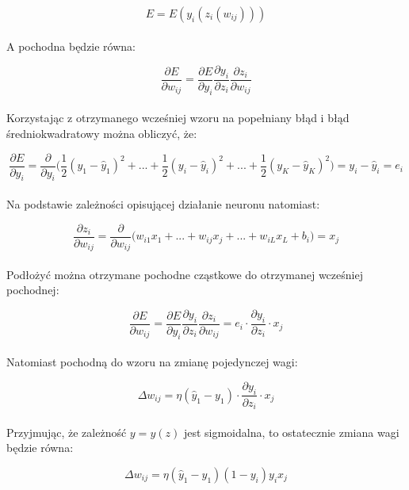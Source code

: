 \documentclass[a4paper, 12pt]{article}
\begin{document}
\begin{equation}
E = E(y_i(z_i(w_{ij})))
\label{Eq:2.20}
\end{equation}\\
A pochodna będzie równa:

\begin{equation}
\frac{\partial E}{\partial w_{ij}} = \frac{\partial E}{\partial y_i} \frac{\partial y_i}{\partial z_i} \frac{\partial z_i}{\partial w_{ij}}
\label{Eq:2.21}
\end{equation}\\
Korzystając z otrzymanego wcześniej wzoru na popełniany błąd i błąd średniokwadratowy można obliczyć, że:

\begin{equation}
\frac{\partial E}{\partial y_i} = \frac{\partial}{\partial y_{i}} \Big( \frac{1}{2} (y_1 - \widehat{y}_1)^{2} + ... + \frac{1}{2} (y_i - \widehat{y}_i)^{2} + ... + \frac{1}{2} (y_K - \widehat{y}_K)^{2} \Big) =  y_i - \widehat{y}_i = e_i
\label{Eq:2.22}
\end{equation}\\
Na podstawie zależności opisującej działanie neuronu natomiast:

\begin{equation}
\frac{\partial z_i}{\partial w_{ij}} = \frac{\partial}{\partial w_{ij}} \Big( w_{i1}x_1 + ... + w_{ij}x_{j} + ... + w_{iL}x_L + b_i \Big) = x_j
\label{Eq:2.23}
\end{equation}\\
Podłożyć można otrzymane pochodne cząstkowe do otrzymanej wcześniej pochodnej:

\begin{equation}
\frac{\partial E}{\partial w_{ij}} = \frac{\partial E}{\partial y_i} \frac{\partial y_i}{\partial z_i} \frac{\partial z_i}{\partial w_{ij}} = e_i \cdot \frac{\partial y_i}{\partial z_i} \cdot x_j
\label{Eq:2.24}
\end{equation}\\
Natomiast pochodną do wzoru na zmianę pojedynczej wagi:

\begin{equation}
\Delta w_{ij} =  \eta (\widehat{y}_1 - y_1) \cdot \frac{\partial y_i}{\partial z_i} \cdot x_j
\label{Eq:2.25}
\end{equation}\\
Przyjmując, że zależność $y= y(z)$ jest sigmoidalna, to ostatecznie zmiana wagi będzie równa:

\begin{equation}
\Delta w_{ij} =  \eta (\widehat{y}_1 - y_1) (1 - y_i)y_i x_j
\label{Eq:2.26}
\end{equation}\\
\end{document}
